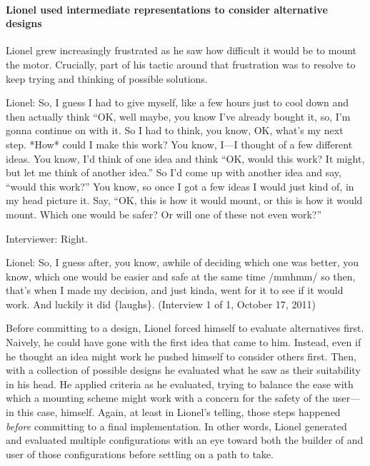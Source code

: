 \paragraph{Lionel used intermediate representations to consider
alternative
designs}\label{lionel-used-intermediate-representations-to-consider-alternative-designs}

Lionel grew increasingly frustrated as he saw how difficult it would be
to mount the motor. Crucially, part of his tactic around that
frustration was to resolve to keep trying and thinking of possible
solutions.

Lionel: So, I guess I had to give myself, like a few hours just to cool
down and then actually think ``OK, well maybe, you know I've already
bought it, so, I'm gonna continue on with it. So I had to think, you
know, OK, what's my next step. *How* could I make this work? You know,
I---I thought of a few different ideas. You know, I'd think of one idea
and think ``OK, would this work? It might, but let me think of another
idea.'' So I'd come up with another idea and say, ``would this work?''
You know, so once I got a few ideas I would just kind of, in my head
picture it. Say, ``OK, this is how it would mount, or this is how it
would mount. Which one would be safer? Or will one of these not even
work?''

Interviewer: Right.

Lionel: So, I guess after, you know, awhile of deciding which one was
better, you know, which one would be easier and safe at the same time
/mmhmm/ so then, that's when I made my decision, and just kinda, went
for it to see if it would work. And luckily it did \{laughs\}.
(Interview 1 of 1, October 17, 2011)

Before committing to a design, Lionel forced himself to evaluate
alternatives first. Naively, he could have gone with the first idea that
came to him. Instead, even if he thought an idea might work he pushed
himself to consider others first. Then, with a collection of possible
designs he evaluated what he saw as their suitability in his head. He
applied criteria as he evaluated, trying to balance the ease with which
a mounting scheme might work with a concern for the safety of the
user---in this case, himself. Again, at least in Lionel's telling, those
steps happened \emph{before} committing to a final implementation. In
other words, Lionel generated and evaluated multiple configurations with
an eye toward both the builder of and user of those configurations
before settling on a path to take.

